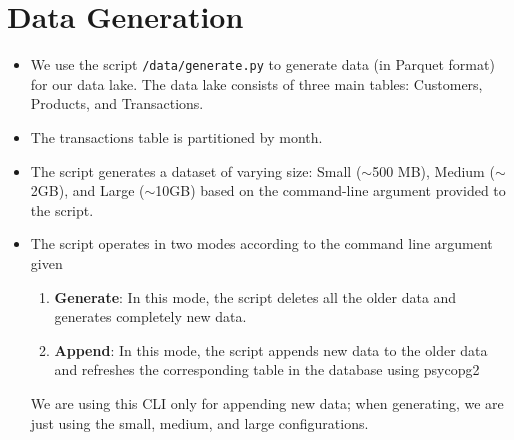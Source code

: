 \documentclass[11pt, a4paper]{article}
\begin{document}
\section{Data Generation}
\begin{itemize}
    \item We use the script \texttt{/data/generate.py} to generate data (in Parquet format) for our data lake. The data lake consists of three main tables: Customers, Products, and Transactions.
\item The transactions table is partitioned by month.
\item The script generates a dataset of varying size: Small ($\sim$500 MB), Medium ($\sim$2GB), and Large ($\sim$10GB) based on the command-line argument provided to the script.
\item The script operates in two modes according to the command line argument given
\begin{enumerate}
    \item \textbf{Generate}: In this mode, the script deletes all the older data and generates completely new data.
    \item \textbf{Append}: In this mode, the script appends new data to the older data and refreshes the corresponding table in the database using psycopg2
\end{enumerate}
We are using this CLI only for appending new data; when generating, we are just using the small, medium, and large configurations.
\end{itemize}
\end{document}
